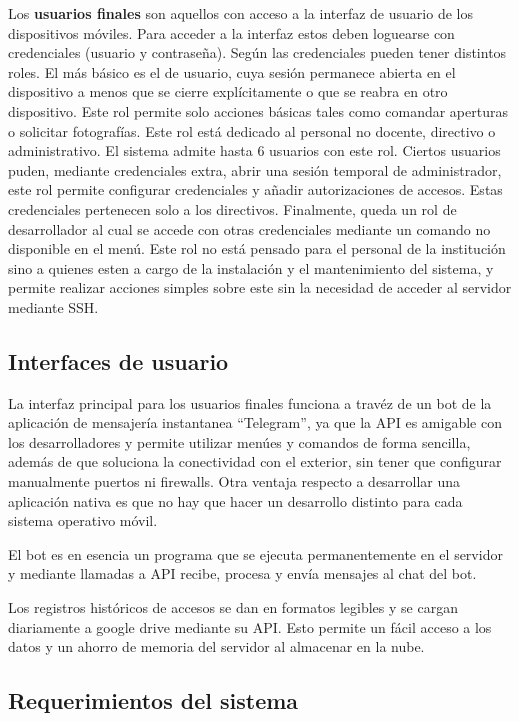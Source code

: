Los \textbf{usuarios finales} son aquellos con acceso a la interfaz de usuario de los dispositivos móviles. Para acceder a la interfaz estos deben loguearse con credenciales (usuario y contraseña). Según las credenciales pueden tener distintos roles. 
El más básico es el de usuario, cuya sesión permanece abierta en el dispositivo a menos que se cierre explícitamente o que se reabra en otro dispositivo. Este rol permite solo acciones básicas tales como comandar aperturas o solicitar fotografías. Este rol está dedicado al personal no docente, directivo o administrativo. El sistema admite hasta 6 usuarios con este rol.
Ciertos usuarios puden, mediante credenciales extra, abrir una sesión temporal de administrador, este rol permite configurar credenciales y añadir autorizaciones de accesos. Estas credenciales pertenecen solo a los directivos.
Finalmente, queda un rol de desarrollador al cual se accede con otras credenciales mediante un comando no disponible en el menú. Este rol no está pensado para el personal de la institución sino a quienes esten a cargo de la instalación y el mantenimiento del sistema, y permite realizar acciones simples sobre este sin la necesidad de acceder al servidor mediante SSH.

\subsection{Interfaces de usuario}

La interfaz principal para los usuarios finales funciona a travéz de un bot de la aplicación de mensajería instantanea \enquote{Telegram}, ya que la API es amigable con los desarrolladores y permite utilizar menúes y comandos de forma sencilla, además de que soluciona la conectividad con el exterior, sin tener que configurar manualmente puertos ni firewalls. Otra ventaja respecto a desarrollar una aplicación nativa es que no hay que hacer un desarrollo distinto para cada sistema operativo móvil.

El bot es en esencia un programa que se ejecuta permanentemente en el servidor y mediante llamadas a API recibe, procesa y envía mensajes al chat del bot.

Los registros históricos de accesos se dan en formatos legibles y se cargan diariamente a google drive mediante su API. Esto permite un fácil acceso a los datos y un ahorro de memoria del servidor al almacenar en la nube.

\subsection{Requerimientos del sistema}


